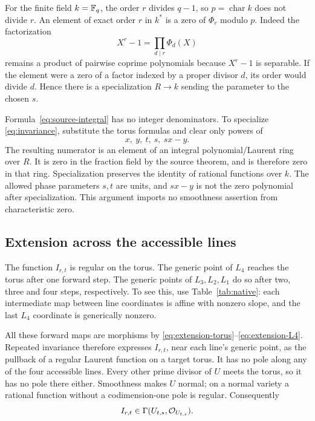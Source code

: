 For the finite field \(k=\mathbb F_q\), the order \(r\) divides
\(q-1\), so \(p=\operatorname{char}k\) does not divide \(r\).
An element of exact order \(r\) in \(k^*\) is a zero of
\(\Phi_r\) modulo \(p\). Indeed the factorization
\[
X^r-1=\prod_{d\mid r}\Phi_d(X)
\]
remains a product of pairwise coprime polynomials because \(X^r-1\)
is separable. If the element were a zero of a factor indexed by a
proper divisor \(d\), its order would divide \(d\). Hence there
is a specialization \(R\to k\) sending the parameter to the
chosen \(s\).

Formula~\eqref{eq:source-integral} has no integer denominators.
To specialize \eqref{eq:invariance}, substitute the torus formulas
and clear only powers of
\[
x,\ y,\ t,\ s,\ sx-y.
\]
The resulting numerator is an element of an integral
polynomial/Laurent ring over \(R\). It is zero in the fraction
field by the source theorem, and is therefore zero in that ring.
Specialization preserves the identity of rational functions over
\(k\). The allowed phase parameters \(s,t\) are units, and
\(sx-y\) is not the zero polynomial after specialization. This
argument imports no smoothness assertion from characteristic zero.

\subsection{Extension across the accessible lines}

The function \(I_{r,t}\) is regular on the torus. The generic point
of \(L_4\) reaches the torus after one forward step. The generic
points of \(L_3,L_2,L_1\) do so after two, three and four steps,
respectively. To see this, use Table~\ref{tab:native}: each
intermediate map between line coordinates is affine with nonzero
slope, and the last \(L_4\) coordinate is generically nonzero.

All these forward maps are morphisms by
\eqref{eq:extension-torus}--\eqref{eq:extension-L4}. Repeated
invariance therefore expresses \(I_{r,t}\), near each line's
generic point, as the pullback of a regular Laurent function on a
target torus. It has no pole along any of the four accessible lines.
Every other prime divisor of \(U\) meets the torus, so it has no
pole there either. Smoothness makes \(U\) normal; on a normal
variety a rational function without a codimension-one pole is regular.
Consequently
\begin{equation}\label{eq:integral-regular}
I_{r,t}\in\Gamma(U_{t,s},\mathcal O_{U_{t,s}}).
\end{equation}

